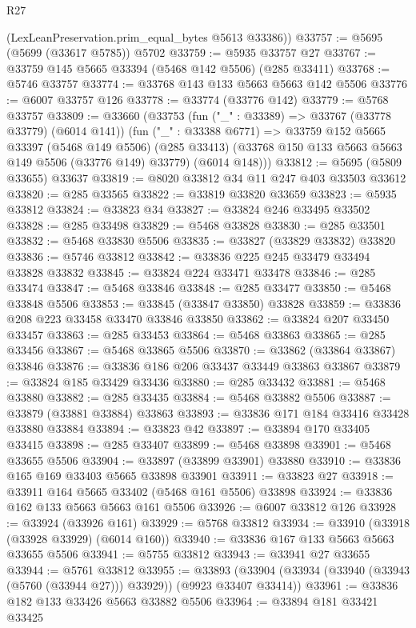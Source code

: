 \begin{lexlean}{R27}
\begin{coremodule}
      (LexLeanPreservation.prim_equal_bytes @5613 @33386))
@33757 := @5695 (@5699 (@33617 @5785)) @5702
@33759 := @5935 @33757 @27
@33767 := @33759 @145 @5665 @33394 (@5468 @142 @5506) (@285 @33411)
@33768 := @5746 @33757
@33774 := @33768 @143 @133 @5663 @5663 @142 @5506
@33776 := @6007 @33757 @126
@33778 := @33774 (@33776 @142)
@33779 := @5768 @33757
@33809 := @33660
    (@33753
      (fun ("_" : @33389) => @33767 (@33778 @33779) (@6014 @141))
      (fun ("_" : @33388 @6771) =>
      @33759
        @152
        @5665
        @33397
        (@5468 @149 @5506)
        (@285 @33413)
        (@33768 @150 @133 @5663 @5663 @149 @5506 (@33776 @149) @33779)
        (@6014 @148)))
@33812 := @5695 (@5809 @33655) @33637
@33819 := @8020 @33812 @34 @11 @247 @403 @33503 @33612
@33820 := @285 @33565
@33822 := @33819 @33820 @33659
@33823 := @5935 @33812
@33824 := @33823 @34
@33827 := @33824 @246 @33495 @33502
@33828 := @285 @33498
@33829 := @5468 @33828
@33830 := @285 @33501
@33832 := @5468 @33830 @5506
@33835 := @33827 (@33829 @33832) @33820
@33836 := @5746 @33812
@33842 := @33836 @225 @245 @33479 @33494 @33828 @33832
@33845 := @33824 @224 @33471 @33478
@33846 := @285 @33474
@33847 := @5468 @33846
@33848 := @285 @33477
@33850 := @5468 @33848 @5506
@33853 := @33845 (@33847 @33850) @33828
@33859 := @33836 @208 @223 @33458 @33470 @33846 @33850
@33862 := @33824 @207 @33450 @33457
@33863 := @285 @33453
@33864 := @5468 @33863
@33865 := @285 @33456
@33867 := @5468 @33865 @5506
@33870 := @33862 (@33864 @33867) @33846
@33876 := @33836 @186 @206 @33437 @33449 @33863 @33867
@33879 := @33824 @185 @33429 @33436
@33880 := @285 @33432
@33881 := @5468 @33880
@33882 := @285 @33435
@33884 := @5468 @33882 @5506
@33887 := @33879 (@33881 @33884) @33863
@33893 := @33836 @171 @184 @33416 @33428 @33880 @33884
@33894 := @33823 @42
@33897 := @33894 @170 @33405 @33415
@33898 := @285 @33407
@33899 := @5468 @33898
@33901 := @5468 @33655 @5506
@33904 := @33897 (@33899 @33901) @33880
@33910 := @33836 @165 @169 @33403 @5665 @33898 @33901
@33911 := @33823 @27
@33918 := @33911 @164 @5665 @33402 (@5468 @161 @5506) @33898
@33924 := @33836 @162 @133 @5663 @5663 @161 @5506
@33926 := @6007 @33812 @126
@33928 := @33924 (@33926 @161)
@33929 := @5768 @33812
@33934 := @33910 (@33918 (@33928 @33929) (@6014 @160))
@33940 := @33836 @167 @133 @5663 @5663 @33655 @5506
@33941 := @5755 @33812
@33943 := @33941 @27 @33655
@33944 := @5761 @33812
@33955 := @33893
    (@33904 (@33934 (@33940 (@33943 (@5760 (@33944 @27))) @33929)) (@9923 @33407 @33414))
@33961 := @33836 @182 @133 @33426 @5663 @33882 @5506
@33964 := @33894 @181 @33421 @33425

\end{coremodule}
\end{lexlean}
